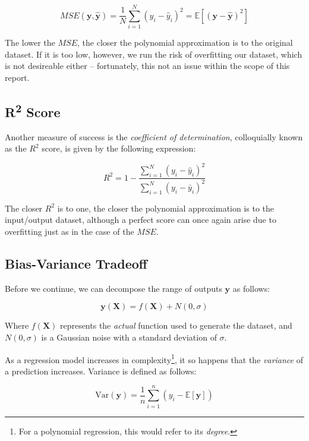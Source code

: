 \documentclass[a4paper,10pt,english]{article}
\begin{document}
\begin{equation}
MSE(\mathbf{y}, \mathbf{\hat{y}}) = \frac{1}{N} \sum_{i=1}^{N} (y_i - \hat{y}_i)^2 = \mathbb{E}\left[(\mathbf{y}-\hat{\mathbf{y}})^{2}\right]
\end{equation}

The lower the $MSE$, the closer the polynomial approximation is to the original dataset.  If it is too low, however, we run the risk of overfitting our dataset, which is not desireable either – fortunately, this not an issue within the scope of this report.

\subsection{R\textsuperscript{2} Score}

Another measure of success is the \textit{coefficient of determination}, colloquially known as the $R^2$ score, is given by the following expression:

\begin{equation}
R^2 = 1 - \frac{\sum_{i=1}^N (y_i - \hat{y}_i)^2 }{\sum_{i=1}^N (y_i - \bar{y}_i)^2 }
\end{equation}

The closer $R^2$ is to one, the closer the polynomial approximation is to the input/output dataset, although a perfect score can once again arise due to overfitting just as in the case of the $MSE$.

\subsection{Bias-Variance Tradeoff}

Before we continue, we can decompose the range of outputs $\mathbf{y}$ as follows:

\begin{equation}
\label{eq_method_5}
\mathbf{y}(\mathbf{X}) = f(\mathbf{X}) + N(0, \sigma) 
\end{equation}

Where $f(\mathbf{X})$ represents the \textit{actual} function used to generate the dataset, and $N(0,\sigma)$ is a Gaussian noise with a standard deviation of $\sigma$.

As a regression model increases in complexity\footnote{For a polynomial regression, this would refer to its \textit{degree}.}, it so happens that the \textit{variance} of a prediction increases.  Variance is defined as follows:

\begin{equation}
\label{eq_method_6}
\text{Var}(\mathbf{y}) = \frac{1}{n} \sum_{i=1}^{n} (y_i - \mathbb{E}[\mathbf{y}] )
\end{equation}
\end{document}
